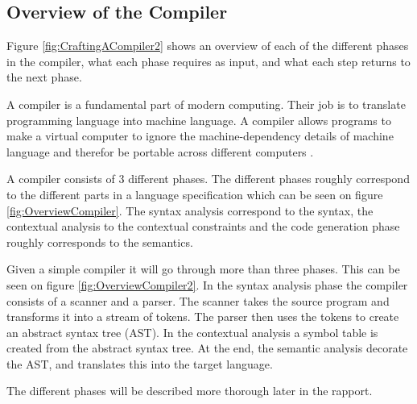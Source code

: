 \subsection{Overview of the Compiler}


Figure \ref{fig:CraftingACompiler2} shows an overview of each of the different phases in the compiler, what each phase requires as input, and what each step returns to the next phase.

A compiler is a fundamental part of modern computing. Their job is to translate programming language into machine language. A compiler allows programs to make a virtual computer to ignore the machine-dependency details of machine language and therefor be portable across different computers  \citep{CraftingACompiler}.


A compiler consists of 3 different phases. The different phases roughly correspond to the different parts in a language specification which can be seen on figure \ref{fig:OverviewCompiler}. The syntax analysis correspond to the syntax, the contextual analysis to the contextual constraints and the code generation phase roughly corresponds to the semantics.

Given a simple compiler it will go through more than three phases. This can be seen on figure \ref{fig:OverviewCompiler2}. In the syntax analysis phase the compiler consists of a scanner and a parser. The scanner takes the source program and transforms it into a stream of tokens. The parser then uses the tokens to create an abstract syntax tree (AST). In the contextual analysis a symbol table is created from the abstract syntax tree. At the end, the semantic analysis decorate the AST, and translates this into the target language.

The different phases will be described more thorough later in the rapport. 